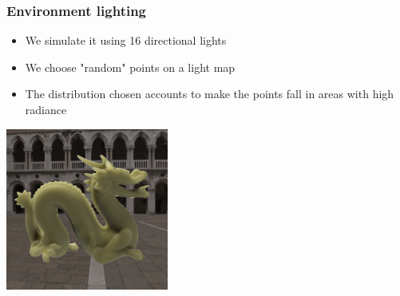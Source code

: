 \documentclass{beamer}
\begin{document}
\begin{frame}
    \frametitle{Environment lighting}
\begin{itemize}
	\item We simulate it using 16 directional lights 
	\item We choose "random" points on a light map 
	\item The distribution chosen accounts to make the points fall in areas with high radiance
\end{itemize}
      \centering
		\includegraphics[width=0.4\textwidth]{skymap}
\end{frame}
\end{document}
